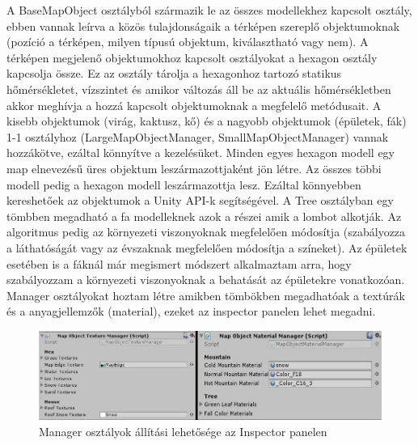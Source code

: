 A BaseMapObject osztályból származik le az összes modellekhez kapcsolt osztály, ebben vannak leírva a közös tulajdonságaik a térképen szereplő objektumoknak (pozíció a térképen, milyen típusú objektum, kiválasztható vagy nem). A térképen megjelenő objektumokhoz kapcsolt osztályokat a hexagon osztály kapcsolja össze. Ez az osztály tárolja  a hexagonhoz tartozó statikus hőmérsékletet, vízszintet és amikor változás áll be az aktuális hőmérsékletben akkor meghívja a hozzá kapcsolt objektumoknak a megfelelő metódusait. A kisebb objektumok (virág, kaktusz, kő) és a nagyobb objektumok (épületek, fák) 1-1 osztályhoz (LargeMapObjectManager, SmallMapObjectManager) vannak hozzákötve, ezáltal könnyítve a kezelésüket.
\newline
\newline Minden egyes hexagon modell egy map elnevezésű üres objektum leszármazottjaként jön létre. Az összes többi modell pedig a hexagon modell leszármazottja lesz. Ezáltal könnyebben kereshetőek az objektumok a Unity API-k segítségével.
\newline
\newline A Tree osztályban egy tömbben megadható a fa modelleknek azok a részei amik a lombot alkotják. Az algoritmus pedig az környezeti viszonyoknak megfelelően módosítja (szabályozza a láthatóságát vagy az évszaknak megfelelően módosítja a színeket).
\newline
\newline Az épületek esetében is a fáknál már megismert módszert alkalmaztam arra, hogy szabályozzam a környezeti viszonyoknak a behatását az épületekre vonatkozóan.
\newline
\newline Manager osztályokat hoztam létre amikben tömbökben megadhatóak a textúrák és a anyagjellemzők (material), ezeket az inspector panelen lehet megadni.

\begin{figure}[h!]
\centering
\includegraphics[scale=0.6]{kepek/Managers.jpg}
\caption{Manager osztályok állítási lehetősége az Inspector panelen}
\label{fig:Managers}
\end{figure}

